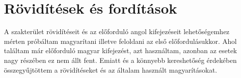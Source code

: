 \chapter*{Rövidítések és fordítások}
\label{sec:abbreviations}

A szakterület rövidítéseit és az előforduló angol kifejezéseit lehetőségemhez mérten  próbáltam magyarítani illetve feloldani az első előfordulásukkor.
Ahol találtam már előforduló magyar kifejezést, azt használtam, azonban az esetek nagy részében ez nem állt fent.
Emiatt és a könnyebb kereshetőség érdekében összegyűjtöttem a rövidítéseket és az általam használt magyarításokat.

